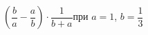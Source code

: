 \begin{ex}[type=expr_calc]
	\begin{condition}
		\( \left(\dfrac{b}{a}-\dfrac{a}{b}\right)\cdot\dfrac{1}{b+a} \)\hspace{0.5cm}при \( a=1 \), \( b=\dfrac{1}{3} \)
	\end{condition}
\end{ex}